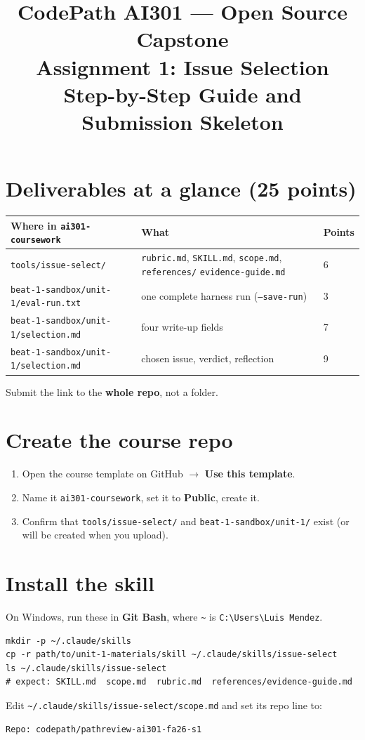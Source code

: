 \documentclass[11pt]{article}
\title{CodePath AI301 --- Open Source Capstone \\ Assignment 1: Issue Selection \\ \large Step-by-Step Guide and Submission Skeleton}
\author{}
\date{}
\begin{document}
\maketitle

\section*{Deliverables at a glance (25 points)}
\begin{center}
\begin{tabular}{@{}lp{6cm}l@{}}
\toprule
\textbf{Where in \texttt{ai301-coursework}} & \textbf{What} & \textbf{Points} \\
\midrule
\texttt{tools/issue-select/} & \texttt{rubric.md}, \texttt{SKILL.md}, \texttt{scope.md}, \texttt{references/} \texttt{evidence-guide.md} & 6 \\
\texttt{beat-1-sandbox/unit-1/eval-run.txt} & one complete harness run (\texttt{--save-run}) & 3 \\
\texttt{beat-1-sandbox/unit-1/selection.md} & four write-up fields & 7 \\
\texttt{beat-1-sandbox/unit-1/selection.md} & chosen issue, verdict, reflection & 9 \\
\bottomrule
\end{tabular}
\end{center}
Submit the link to the \textbf{whole repo}, not a folder.

\section{Create the course repo}
\begin{enumerate}[label=\textbf{1.\arabic*}]
  \item Open the course template on GitHub $\rightarrow$ \textbf{Use this template}.
  \item Name it \texttt{ai301-coursework}, set it to \textbf{Public}, create it.
  \item Confirm that \texttt{tools/issue-select/} and \texttt{beat-1-sandbox/unit-1/} exist (or will be created when you upload).
\end{enumerate}

\section{Install the skill}
On Windows, run these in \textbf{Git Bash}, where \texttt{\textasciitilde} is \texttt{C:\textbackslash Users\textbackslash Luis Mendez}.
\begin{lstlisting}
mkdir -p ~/.claude/skills
cp -r path/to/unit-1-materials/skill ~/.claude/skills/issue-select
ls ~/.claude/skills/issue-select
# expect: SKILL.md  scope.md  rubric.md  references/evidence-guide.md
\end{lstlisting}
Edit \texttt{\textasciitilde/.claude/skills/issue-select/scope.md} and set its repo line to:
\begin{lstlisting}
Repo: codepath/pathreview-ai301-fa26-s1
\end{lstlisting}
\end{document}
